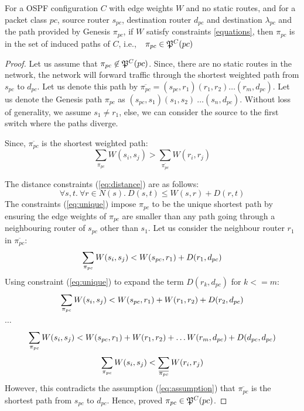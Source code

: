 \begin{theorem}
	For a OSPF configuration $C$ with edge weights $W$ and no 
	static routes, and for a packet class $pc$, source router $s_{pc}$, destination router $d_{pc}$ and destination $\lambda_{pc}$ and the path provided by Genesis $\pi_{pc}$, if $W$ satisfy constraints \cref{equations}, then $\pi_{pc}$ 
	is in the set of induced paths of $C$, i.e., $~~\pi_{pc} \in \mathfrak{P}^C(pc)$
\end{theorem}
\begin{proof}
	Let us assume that $\pi_{pc} \not\in \mathfrak{P}^C(pc)$. Since, there are no
	static routes in the network, the network will forward traffic through
	the shortest weighted path from $s_{pc}$ to $d_{pc}$. Let us denote
	this path by $\overline{\pi_{pc}} = (s_{pc}, r_1)(r_1, r_2)\ldots (r_m, d_{pc})$. 
	Let us denote the Genesis path $\pi_{pc}$ as $(s_{pc}, s_1)(s_1, s_2) \
	\ldots (s_n, d_{pc})$. Without loss of generality, we assume $s_1 \not= r_1$, 
	else, we can consider the source to the first switch where the paths diverge. 
	
	\noindent Since, $\overline{\pi_{pc}}$ is the shortest weighted path:
	\begin{equation} \label{eq:assumption}
	\sum_{\pi_{pc}} W(s_i, s_j) > \sum_{\overline{\pi_{pc}}} W(r_i, r_j)
	\end{equation}
	
The distance constraints (\ref{eq:distance}) are as follows:  
	\[
\forall s, t. ~\forall r \in N(s).~
D(s,t) \leq W(s,r) + D(r,t)
\]
The constraints (\ref{eq:unique}) impose $\pi_{pc}$ to be the
unique shortest path by ensuring the edge weights of $\pi_{pc}$
are smaller than any path going through a neighbouring 
router of $s_{pc}$ other than $s_1$. Let us consider the 
neighbour router $r_1$ in $\overline{\pi_{pc}}$:
\[
	\sum_{\mathclap{\substack{\pi_{pc}}}} 
	W(s_i,s_j) < W(s_{pc}, r_1)+ D(r_1, d_{pc})
\]
Using constraint (\ref{eq:unique}) to expand the term $D(r_k, d_{pc})$ for $k <= m$: 
\[
\sum_{\mathclap{\substack{\pi_{pc}}}} 
W(s_i,s_j) < W(s_{pc}, r_1)+ W(r_1, r_2) + D(r_2, d_{pc})
\] 
\begin{center}
$\ldots$
\end{center}
\[
\sum_{\mathclap{\substack{\pi_{pc}}}} 
W(s_i,s_j) < W(s_{pc}, r_1)+ W(r_1, r_2) + \ldots W(r_{m}, d_{pc}) + D(d_{pc}, d_{pc})
\] 
\[
\sum_{\mathclap{\substack{\pi_{pc}}}} 
W(s_i,s_j) < 
\sum_{\mathclap{\substack{\overline{\pi_{pc}}}}} 
W(r_i,r_j)
\]
However, this contradicts the assumption (\ref{eq:assumption}) that 
$\overline{\pi_{pc}}$ is the shortest path from $s_{pc}$ to $d_{pc}$. Hence, proved 
$\pi_{pc} \in \mathfrak{P}^C(pc)$.
\end{proof}

